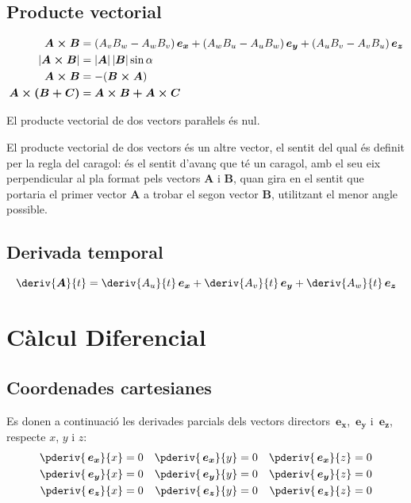 \documentclass[catalan,a4paper,twoside,11pt]{article}
\begin{document}
\subsection{Producte vectorial}
\vspace{-7mm}
\begin{align}
    \boldsymbol{A\times B} &= (A_v B_w - A_w B_v)\va + (A_w B_u - A_u B_w)\vb +
    (A_u B_v - A_v B_u)\vc \\
    |\boldsymbol{A\times B}| &=|\boldsymbol{A}| \, |\boldsymbol{B}| \sin\alpha\\
    \boldsymbol{A\times B} &=-(\boldsymbol{B\times A})\\
    \boldsymbol{A\times(B+C)} &= \boldsymbol{A\times B+ A\times C}
\end{align}

El producte vectorial de dos vectors paraŀlels  és nul.

El producte vectorial de dos vectors és un altre vector, el
sentit del qual és definit per la regla del caragol: és el sentit
d'avanç que té un caragol, amb el seu eix perpendicular al
pla format pels vectors  $\boldsymbol{A}$ i $\boldsymbol{B}$, quan
gira en el sentit que portaria el primer vector  $\boldsymbol{A}$ a
trobar el segon vector $\boldsymbol{B}$, utilitzant el menor angle
possible.

\subsection{Derivada temporal}
\begin{equation}
    \deriv{\boldsymbol{A}}{t} = \deriv{A_u}{t}\va +
    \deriv{A_v}{t}\vb + \deriv{A_w}{t}\vc
\end{equation}


\section{Càlcul Diferencial }

\subsection{Coordenades cartesianes}
\renewcommand{\va}{\ensuremath{\,\boldsymbol{e_x}}}
\renewcommand{\vb}{\ensuremath{\,\boldsymbol{e_y}}}
\renewcommand{\vc}{\ensuremath{\,\boldsymbol{e_z}}}

Es donen a continuació les derivades parcials dels vectors directors $\va$, $\vb$ i $\vc$, respecte $x$, $y$ i $z$:
\begin{subequations}
\begin{align}
   \pderiv{\va}{x} &= 0 & \pderiv{\va}{y} &= 0 & \pderiv{\va}{z} &= 0 \\
   \pderiv{\vb}{x} &= 0 & \pderiv{\vb}{y} &= 0 & \pderiv{\vb}{z} &= 0 \\
   \pderiv{\vc}{x} &= 0 & \pderiv{\vc}{y} &= 0 & \pderiv{\vc}{z} &= 0
\end{align}
\end{subequations}
\end{document}
